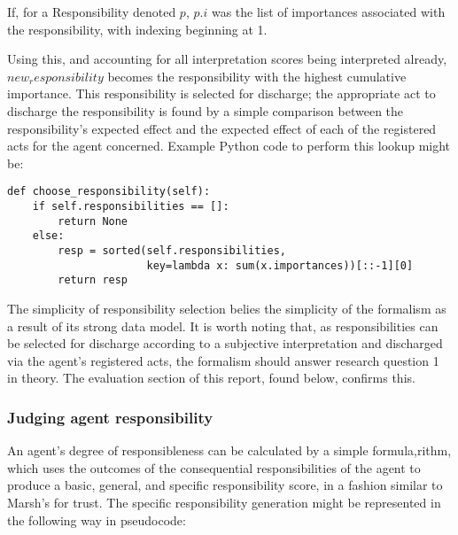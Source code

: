 If, for a Responsibility denoted \(p\), \(p.i\) was the list of importances associated with the responsibility, with indexing beginning at 1.\par

Using this, and accounting for all interpretation scores being interpreted already, \(new_responsibility\) becomes the responsibility with the highest cumulative importance. This responsibility is selected for discharge; the appropriate act to discharge the responsibility is found by a simple comparison between the responsibility's expected effect and the expected effect of each of the registered acts for the agent concerned. Example Python code to perform this lookup might be:

\begin{lstlisting}
def choose_responsibility(self):
    if self.responsibilities == []:
        return None
    else:
        resp = sorted(self.responsibilities,
                      key=lambda x: sum(x.importances))[::-1][0]
        return resp
\end{lstlisting}

The simplicity of responsibility selection belies the simplicity of the formalism as a result of its strong data model. It is worth noting that, as responsibilities can be selected for discharge according to a subjective interpretation and discharged via the agent's registered acts, the formalism should answer research question 1 in theory. The evaluation section of this report, found below, confirms this.\par

\subsubsection{Judging agent responsibility}  %
An agent's degree of responsibleness can be calculated by a simple formula,rithm, which uses the outcomes of the consequential responsibilities of the agent to produce a basic, general, and specific responsibility score, in a fashion similar to Marsh's for trust\cite{Marsh1994FormalisingConcept}. The specific responsibility generation might be represented in the following way in pseudocode:

